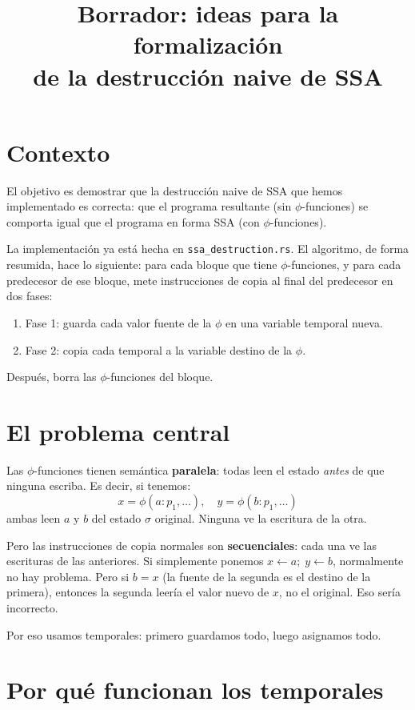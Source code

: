 \documentclass[12pt, a4paper]{article}
\title{Borrador: ideas para la formalización\\de la destrucción naive de SSA}
\author{}
\date{}
\begin{document}
\maketitle

\section{Contexto}

El objetivo es demostrar que la destrucción naive de SSA que hemos implementado es correcta:
que el programa resultante (sin $\phi$-funciones) se comporta igual que el programa en forma
SSA (con $\phi$-funciones).

La implementación ya está hecha en \texttt{ssa\_destruction.rs}. El algoritmo, de forma
resumida, hace lo siguiente: para cada bloque que tiene $\phi$-funciones, y para cada
predecesor de ese bloque, mete instrucciones de copia al final del predecesor en dos fases:
\begin{enumerate}
  \item Fase 1: guarda cada valor fuente de la $\phi$ en una variable temporal nueva.
  \item Fase 2: copia cada temporal a la variable destino de la $\phi$.
\end{enumerate}
Después, borra las $\phi$-funciones del bloque.

\section{El problema central}

Las $\phi$-funciones tienen semántica \textbf{paralela}: todas leen el estado
\emph{antes} de que ninguna escriba. Es decir, si tenemos:
\[
  x = \phi(a : p_1, \ldots), \quad y = \phi(b : p_1, \ldots)
\]
ambas leen $a$ y $b$ del estado $\sigma$ original. Ninguna ve la escritura de la otra.

Pero las instrucciones de copia normales son \textbf{secuenciales}: cada una ve las
escrituras de las anteriores. Si simplemente ponemos $x \leftarrow a;\; y \leftarrow b$,
normalmente no hay problema. Pero si $b = x$ (la fuente de la segunda es el destino de
la primera), entonces la segunda leería el valor nuevo de $x$, no el original. Eso sería
incorrecto.

Por eso usamos temporales: primero guardamos todo, luego asignamos todo.

\section{Por qué funcionan los temporales}
\end{document}
